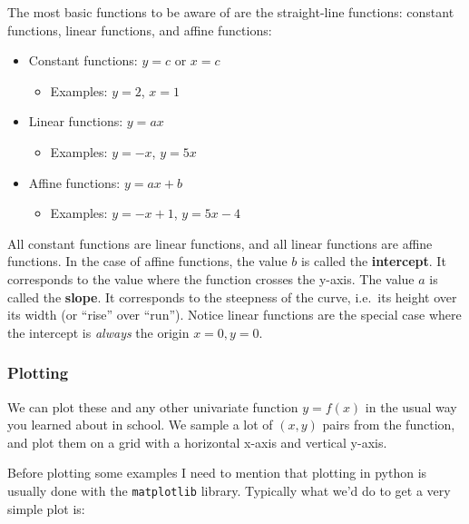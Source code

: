 \documentclass[
  letterpaper,
  DIV=11,
  numbers=noendperiod]{scrreprt}
\providecommand{\tightlist}{%
  \setlength{\itemsep}{0pt}\setlength{\parskip}{0pt}}\usepackage{longtable,booktabs,array}
\begin{document}
The most basic functions to be aware of are the straight-line functions:
constant functions, linear functions, and affine functions:

\begin{itemize}
\tightlist
\item
  Constant functions: \(y=c\) or \(x=c\)

  \begin{itemize}
  \tightlist
  \item
    Examples: \(y=2\), \(x=1\)
  \end{itemize}
\item
  Linear functions: \(y=ax\)

  \begin{itemize}
  \tightlist
  \item
    Examples: \(y=-x\), \(y=5x\)
  \end{itemize}
\item
  Affine functions: \(y=ax+b\)

  \begin{itemize}
  \tightlist
  \item
    Examples: \(y=-x+1\), \(y=5x-4\)
  \end{itemize}
\end{itemize}

All constant functions are linear functions, and all linear functions
are affine functions. In the case of affine functions, the value \(b\)
is called the \textbf{intercept}. It corresponds to the value where the
function crosses the y-axis. The value \(a\) is called the
\textbf{slope}. It corresponds to the steepness of the curve, i.e.~its
height over its width (or ``rise'' over ``run''). Notice linear
functions are the special case where the intercept is \emph{always} the
origin \(x=0, y=0\).

\hypertarget{plotting}{%
\subsubsection{Plotting}\label{plotting}}

We can plot these and any other univariate function \(y=f(x)\) in the
usual way you learned about in school. We sample a lot of \((x,y)\)
pairs from the function, and plot them on a grid with a horizontal
x-axis and vertical y-axis.

Before plotting some examples I need to mention that plotting in python
is usually done with the \texttt{matplotlib} library. Typically what
we'd do to get a very simple plot is:
\end{document}
